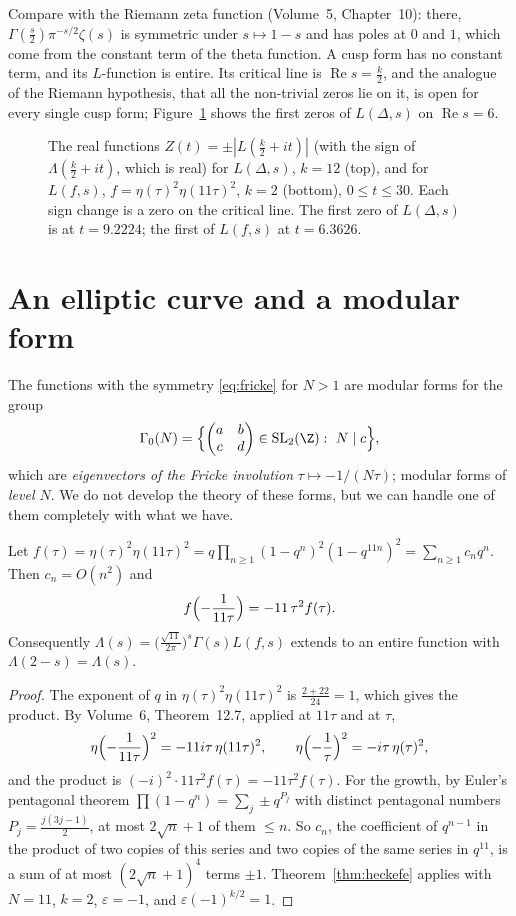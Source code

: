 Compare with the Riemann zeta function (Volume~5, Chapter~10): there, $\Gamma(\frac s2)\pi^{-s/2}\zeta(s)$ is symmetric under $s\mapsto1-s$ and has poles at $0$ and $1$, which come from the constant
term of the theta function. A cusp form has no constant term, and its $L$-function is entire. Its critical line is $\operatorname{Re}s=\frac k2$, and the analogue of
the Riemann hypothesis, that all the non-trivial zeros lie on it, is open for every single cusp form; Figure~\ref{fig:hardy} shows the first zeros of $L(\Delta,s)$ on
$\operatorname{Re}s=6$.

\begin{figure}[ht]
\centering{}
\caption{The real functions $Z(t)=\pm|L(\frac k2+it)|$ (with the sign of $\Lambda(\frac k2+it)$, which is real) for $L(\Delta,s)$, $k=12$ (top), and for $L(f,s)$,
$f=\eta(\tau)^2\eta(11\tau)^2$, $k=2$ (bottom), $0\le t\le30$. Each sign change is a zero on the critical line. The first zero of $L(\Delta,s)$ is at $t=9.2224$;
the first of $L(f,s)$ at $t=6.3626$.}
\label{fig:hardy}
\end{figure}

\section{An elliptic curve and a modular form}

The functions with the symmetry \eqref{eq:fricke} for $N>1$ are modular forms for the group
\[
\Gamma_0(N)=\Bigl\{\begin{pmatrix}a&b\\c&d\end{pmatrix}\in\mathrm{SL}_2(\Z):\ N\mid c\Bigr\},
\]
which are \emph{eigenvectors of the Fricke involution} $\tau\mapsto-1/(N\tau)$; modular forms of \emph{level $N$}. We do not develop the theory of these forms, but
we can handle one of them completely with what we have.

\begin{proposition}\label{prop:eta11}
Let $f(\tau)=\eta(\tau)^2\eta(11\tau)^2=q\prod_{n\ge1}(1-q^n)^2(1-q^{11n})^2=\sum_{n\ge1}c_nq^n$. Then $c_n=O(n^2)$ and
\[
f\Bigl(-\frac1{11\tau}\Bigr)=-11\,\tau^2f(\tau).
\]
Consequently $\Lambda(s)=\bigl(\frac{\sqrt{11}}{2\pi}\bigr)^s\Gamma(s)L(f,s)$ extends to an entire function with $\Lambda(2-s)=\Lambda(s)$.
\end{proposition}
\begin{proof}
The exponent of $q$ in $\eta(\tau)^2\eta(11\tau)^2$ is $\frac{2+22}{24}=1$, which gives the product. By Volume~6, Theorem~12.7, applied at $11\tau$ and at $\tau$,
\[
\eta\Bigl(-\frac1{11\tau}\Bigr)^2=-11i\tau\,\eta(11\tau)^2,\qquad\eta\Bigl(-\frac1\tau\Bigr)^2=-i\tau\,\eta(\tau)^2,
\]
and the product is $(-i)^2\cdot11\tau^2f(\tau)=-11\tau^2f(\tau)$. For the growth, by Euler's pentagonal theorem $\prod(1-q^n)=\sum_j\pm q^{P_j}$ with distinct pentagonal
numbers $P_j=\frac{j(3j-1)}2$, at most $2\sqrt n+1$ of them $\le n$. So $c_n$, the coefficient of $q^{n-1}$ in the product of two copies of this series and two copies of
the same series in $q^{11}$, is a sum of at most $(2\sqrt n+1)^4$ terms $\pm1$. Theorem~\ref{thm:heckefe} applies with $N=11$, $k=2$, $\varepsilon=-1$, and
$\varepsilon(-1)^{k/2}=1$.
\end{proof}

